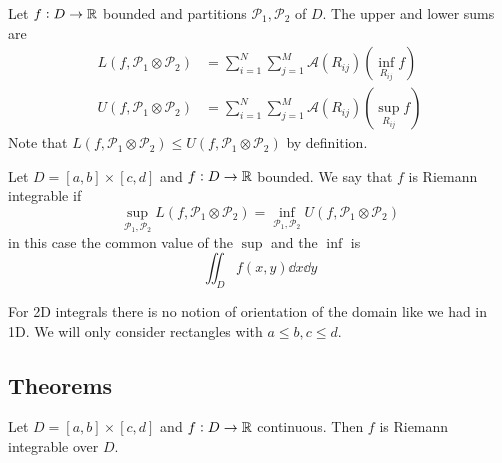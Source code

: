 \documentclass[12pt]{extarticle}
\begin{document}
\begin{definition}
    Let $f : D \to \mathbb{R}$ bounded and partitions $\mathcal{P_1}, \mathcal{P_2}$ of $D$.
    The upper and lower sums are
    \begin{align}
        L(f, \mathcal{P}_1 \otimes \mathcal{P}_2) & = \sum_{i = 1}^N \sum_{j = 1}^M \mathcal{A}(R_{ij}) \left( \inf_{R_{ij}} f \right) \\
        U(f, \mathcal{P}_1 \otimes \mathcal{P}_2) & = \sum_{i = 1}^N \sum_{j = 1}^M \mathcal{A}(R_{ij}) \left( \sup_{R_{ij}} f \right)
    \end{align}
    Note that $L(f, \mathcal{P}_1 \otimes \mathcal{P}_2) \leq U(f, \mathcal{P}_1 \otimes \mathcal{P}_2)$ by definition.
\end{definition}

\begin{definition}
    Let $D=[a, b] \times [c, d]$ and $f : D \to \mathbb{R}$ bounded.
    We say that $f$ is Riemann integrable if
    \begin{equation}
        \sup_{\mathcal P_1, \mathcal P_2}         L(f, \mathcal P_1 \otimes \mathcal P_2) = \inf_{\mathcal P_1, \mathcal P_2} U (f, \mathcal P_1 \otimes \mathcal P_2)
    \end{equation}
    in this case the common value of the $\sup$ and the $\inf$ is
    \begin{equation}
        \iint_D f(x, y) \dd{x} \dd{y}
    \end{equation}
\end{definition}

\begin{remark}[orientation]
    For 2D integrals there is no notion of orientation of the domain like we had in 1D.
    We will only consider rectangles with $a \leq b, c \leq d$.
\end{remark}

\subsection{Theorems}

\begin{proposition}
    Let $D=[a, b] \times [c, d]$ and $f : D \to \mathbb{R}$ continuous.
    Then $f$ is Riemann integrable over $D$.
\end{proposition}
\end{document}
